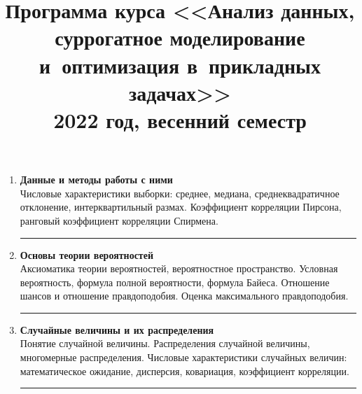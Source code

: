 \documentclass[12pt,oneside,openany]{article}
\begin{document}
\title{
  \large
  \textbf{Программа курса <<Анализ данных, суррогатное моделирование и~оптимизация в~прикладных задачах>>} \\
  2022 год, весенний семестр
}

\author{}
\date{}

\thispagestyle{empty}

\vspace{-10ex}


\begin{enumerate}

  \item \textbf{Данные и методы работы с ними} \\
  Числовые характеристики выборки: среднее, медиана, среднеквадратичное отклонение, интерквартильный размах. Коэффициент корреляции Пирсона, ранговый коэффициент корреляции Спирмена.
  \begin{center}\rule{1.0\linewidth}{0.5pt}\end{center}

  \item \textbf{Основы теории вероятностей} \\
  Аксиоматика теории вероятностей, вероятностное пространство. Условная вероятность, формула полной вероятности, формула Байеса. Отношение шансов и отношение правдоподобия. Оценка максимального правдоподобия.
  \begin{center}\rule{1.0\linewidth}{0.5pt}\end{center}

  \item \textbf{Случайные величины и их распределения} \\
  Понятие случайной величины. Распределения случайной величины, многомерные распределения. Числовые характеристики случайных величин: математическое ожидание, дисперсия, ковариация, коэффициент корреляции.
  \begin{center}\rule{1.0\linewidth}{0.5pt}\end{center}


\end{enumerate}
\end{document}
